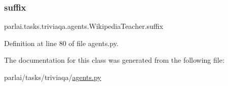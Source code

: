 \subsubsection{\texorpdfstring{suffix}{suffix}}
{\footnotesize\ttfamily parlai.\+tasks.\+triviaqa.\+agents.\+Wikipedia\+Teacher.\+suffix}



Definition at line 80 of file agents.\+py.



The documentation for this class was generated from the following file\+:\begin{DoxyCompactItemize}
\item 
parlai/tasks/triviaqa/\hyperlink{parlai_2tasks_2triviaqa_2agents_8py}{agents.\+py}\end{DoxyCompactItemize}
